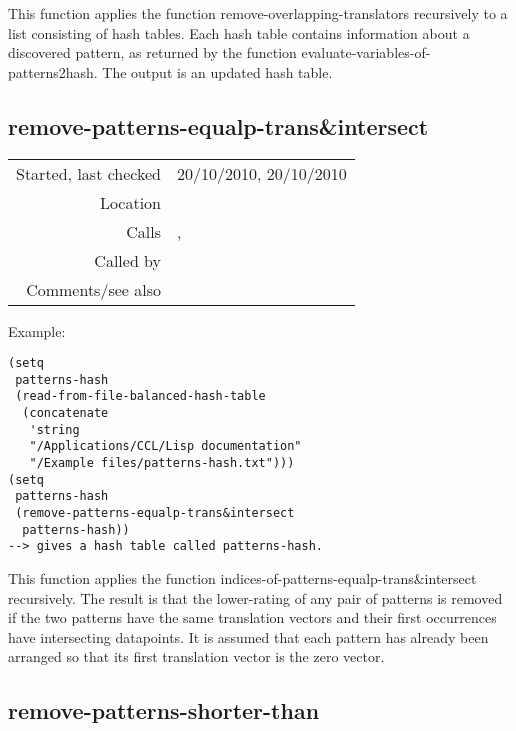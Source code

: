 \noindent This function applies the function
remove-overlapping-translators recursively to a list
consisting of hash tables. Each hash table contains
information about a discovered pattern, as returned by
the function evaluate-variables-of-patterns2hash. The
output is an updated hash table.


\subsection*{remove-patterns-equalp-trans\&intersect}\label{fun:remove-patterns-equalp-transnintersect}

\vspace{0.3cm}
\begin{tabular}{r|p{8cm}}
Started, last checked & 20/10/2010, 20/10/2010 \\
Location & \nameref{sec:pattern-inheritance-preliminaries} \\
Calls & \nameref{fun:indices-of-patterns-equalp-transnintersect},\newline \nameref{fun:remove-nth-list} \\
Called by & \nameref{fun:prepare-for-pattern-inheritance} \\
Comments/see also & 
\end{tabular}

\vspace{0.5cm}
\noindent Example:
\begin{verbatim}
(setq
 patterns-hash
 (read-from-file-balanced-hash-table
  (concatenate
   'string
   "/Applications/CCL/Lisp documentation"
   "/Example files/patterns-hash.txt")))
(setq
 patterns-hash
 (remove-patterns-equalp-trans&intersect
  patterns-hash))
--> gives a hash table called patterns-hash.
\end{verbatim}

\noindent This function applies the function
indices-of-patterns-equalp-trans\&intersect
recursively. The result is that the lower-rating of
any pair of patterns is removed if the two patterns
have the same translation vectors and their first
occurrences have intersecting datapoints. It is
assumed that each pattern has already been arranged so
that its first translation vector is the zero
vector.


\subsection*{remove-patterns-shorter-than}\label{fun:remove-patterns-shorter-than}

